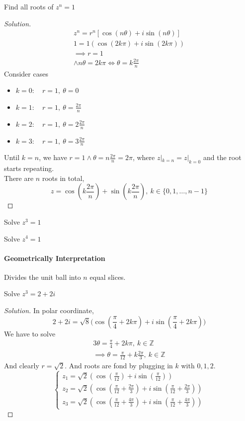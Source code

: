 \documentclass[10pt]{article}
\begin{document}
		\begin{example}
			Find all roots of $z^n = 1$
			\begin{proof}[Solution]
				\begin{gather*}
					z^n = r^n [\cos(n\theta) + i \sin(n \theta)] \\
					1 = 1(\cos(2k\pi) + i \sin(2k\pi)) \\
					\implies r = 1 \\
					\land n\theta = 2 k \pi \iff \theta = k \frac{2\pi}{n} 
				\end{gather*}
				Consider cases 
				\begin{itemize}
					\item $k=0:\quad r=1,\ \theta=0$
					\item $k=1:\quad r=1,\ \theta=\frac{2\pi}{n}$
					\item $k=2:\quad r=1,\ \theta=2\frac{2\pi}{n}$
					\item $k=3:\quad r=1,\ \theta=3\frac{2\pi}{n}$
				\end{itemize}
				Until $k=n$, we have $r=1 \land \theta=n\frac{2\pi}{n}=2\pi$, where $z|_{k=n} = z|_{k=0}$ and the root starts repeating. \\
				There are $n$ roots in total,
				\[
					z = \cos(k \frac{2\pi}{n}) + \sin(k \frac{2\pi}{n}),\ k \in \{0, 1, \dots, n-1\}
				\]
			\end{proof}
		\end{example}
		\begin{example}
			Solve $z^3 = 1$
		\end{example}
		\begin{example}
			Solve $z^4 = 1$
		\end{example}
		\paragraph{Geometrically Interpretation} Divides the unit ball into $n$ equal slices.
		\begin{example}
			Solve $z^3 = 2 + 2 i$
			\begin{proof}[Solution]
				In polar coordinate, 
				\[
					2+2i = \sqrt{8} \Big(\cos(\frac{\pi}{4} + 2k\pi) + i \sin(\frac{\pi}{4} + 2k\pi) \Big)
				\]
				We have to solve 
				\begin{gather*}
					3\theta = \frac{\pi}{4} + 2k\pi,\ k \in \mathbb{Z} \\
					\implies \theta = \frac{\pi}{12} + k \frac{2\pi}{3},\ k \in \mathbb{Z}
				\end{gather*}
				And clearly $r = \sqrt{2}$. And roots are fond by plugging in $k$ with $0,1,2$.
				\[
					\begin{cases}
						z_1 = \sqrt{2} (\cos(\frac{\pi}{12}) + i \sin(\frac{\pi}{12})) \\
						z_2 = \sqrt{2} (\cos(\frac{\pi}{12} + \frac{2\pi}{3}) + i \sin(\frac{\pi}{12} + \frac{2\pi}{3})) \\
						z_3 = \sqrt{2} (\cos(\frac{\pi}{12} + \frac{4\pi}{3}) + i \sin(\frac{\pi}{12} + \frac{4\pi}{3}))
					\end{cases}
				\]
			\end{proof}
		\end{example}
		
\end{document}
